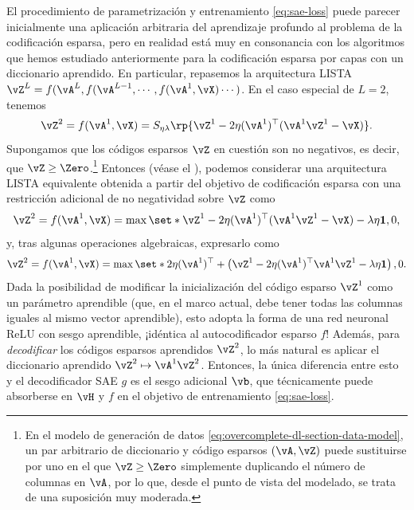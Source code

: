 \documentclass[../../book-main.tex]{subfiles}
\begin{document}
El procedimiento de parametrización y entrenamiento \eqref{eq:sae-loss} puede parecer inicialmente
una aplicación arbitraria del aprendizaje profundo al problema de la codificación
esparsa, pero en realidad está muy en consonancia con los algoritmos que hemos estudiado
anteriormente para la codificación esparsa por capas con un diccionario aprendido.
En particular, repasemos la arquitectura LISTA %
$\vZ^{L} = f(\vA^L, f(\vA^{L-1}, \cdots, f(\vA^1, \vX) \cdots )$.
En el caso especial de $L=2$, tenemos
\begin{equation}
    \vZ^2 = f(\vA^1, \vX)
    =S_{\eta\lambda}\rp{\vZ^{1} - 2\eta(\vA^{1})^{\top}(\vA^1\vZ^{1} - \vX)}.
\end{equation}
Supongamos que los códigos esparsos $\vZ$ en cuestión son no negativos, es decir,
que $\vZ \geq \Zero$.\footnote{En el modelo de generación de datos
    \eqref{eq:overcomplete-dl-section-data-model}, un par arbitrario
    de diccionario y código esparsos $(\vA, \vZ)$ puede sustituirse por uno en el que
    $\vZ \geq \Zero$ simplemente duplicando el número de columnas en $\vA$, por lo que,
desde el punto de vista del modelado, se trata de una suposición muy moderada.}
Entonces (véase el ), podemos considerar una arquitectura LISTA equivalente
obtenida a partir del objetivo de codificación esparsa con una restricción adicional
de no negatividad sobre $\vZ$ como
\begin{equation}
    \vZ^2 = f(\vA^1, \vX)
    =\max \set*{\vZ^{1} - 2\eta(\vA^{1})^{\top}(\vA^1\vZ^{1} - \vX)
    - \lambda\eta \mathbf{1}, 0},
\end{equation}
y, tras algunas operaciones algebraicas, expresarlo como
\begin{equation}
    \vZ^2 = f(\vA^1, \vX)
    =\max \set*{
        2\eta(\vA^{1})^{\top}
        +
        \left(
            \vZ^{1} - 2\eta(\vA^{1})^{\top}\vA^1\vZ^{1} - \lambda\eta \mathbf{1}
        \right), 0
    }.
\end{equation}
Dada la posibilidad de modificar la inicialización del código esparso $\vZ^1$ como
un parámetro aprendible (que, en el marco actual, debe tener todas las columnas
iguales al mismo vector aprendible), esto adopta la forma de una red neuronal ReLU
con sesgo aprendible, ¡idéntica al autocodificador esparso $f$!
Además, para \textit{decodificar} los códigos esparsos aprendidos $\vZ^2$, lo más natural es
aplicar el diccionario aprendido $\vZ^2 \mapsto \vA^1 \vZ^2$. Entonces, la única
diferencia entre esto y el decodificador SAE $g$ es el sesgo adicional $\vb$,
que técnicamente puede absorberse en $\vH$ y $f$ en el objetivo de entrenamiento
\eqref{eq:sae-loss}.
\end{document}
